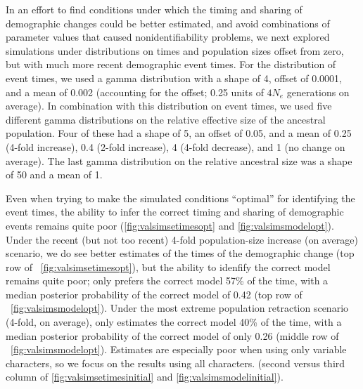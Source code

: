 In an effort to find conditions under which the timing and sharing of
demographic changes could be better estimated, and avoid combinations
of parameter values that caused nonidentifiability problems,
we next explored simulations under distributions on times and population sizes
offset from zero, but with much more recent demographic event times.
For the distribution of event times, we used a gamma distribution
with a shape of 4, offset of 0.0001, and a mean of 0.002 (accounting
for the offset; 0.25 units of $4N_e$ generations on average).
In combination with this distribution on event times,
we used five different gamma distributions on the relative
effective size of the ancestral population.
Four of these had a shape of 5, an offset of 0.05, and a mean
of
0.25 (4-fold increase),
0.4 (2-fold increase),
4 (4-fold decrease),
and
1 (no change on average).
The last gamma distribution on the relative ancestral size was a shape of 50
and a mean of 1.

Even when trying to make the simulated conditions ``optimal'' for identifying
the event times, the ability to infer the correct timing and sharing of
demographic events remains quite poor
(\figs \ref{fig:valsimsetimesopt} and \ref{fig:valsimsmodelopt}).
Under the recent (but not too recent) 4-fold population-size increase (on
average) scenario, we do see better estimates of the times of the demographic
change
(top row of \fig{}~\ref{fig:valsimsetimesopt}),
but the ability to idenfify the correct model remains quite poor;
\ecoevolity only prefers the correct model 57\% of the time, with
a median posterior probability of the correct model of 0.42
(top row of \fig{}~\ref{fig:valsimsmodelopt}).
Under the most extreme population retraction scenario (4-fold, on average),
\ecoevolity only estimates the correct model 40\% of the time, with a median
posterior probability of the correct model of only 0.26
(middle row of \fig{}~\ref{fig:valsimsmodelopt}).
Estimates are especially poor when using only variable characters,
so we focus on the results using all characters.
(second versus third column of \figs
\ref{fig:valsimsetimesinitial}
and
\ref{fig:valsimsmodelinitial}).

